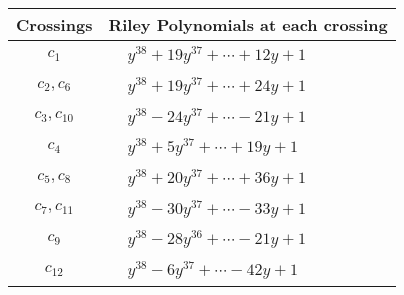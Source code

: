 \documentclass[1p]{elsarticle_modified}
\theoremstyle{definition}
\begin{document}
\begin{tabular}{m{50pt}|m{274pt}}
Crossings & \hspace{64pt}Riley Polynomials at each crossing \\
\hline $$\begin{aligned}c_{1}\end{aligned}$$&$\begin{aligned}
&y^{38}+19 y^{37}+\cdots+12 y+1
\end{aligned}$\\
\hline $$\begin{aligned}c_{2},c_{6}\end{aligned}$$&$\begin{aligned}
&y^{38}+19 y^{37}+\cdots+24 y+1
\end{aligned}$\\
\hline $$\begin{aligned}c_{3},c_{10}\end{aligned}$$&$\begin{aligned}
&y^{38}-24 y^{37}+\cdots-21 y+1
\end{aligned}$\\
\hline $$\begin{aligned}c_{4}\end{aligned}$$&$\begin{aligned}
&y^{38}+5 y^{37}+\cdots+19 y+1
\end{aligned}$\\
\hline $$\begin{aligned}c_{5},c_{8}\end{aligned}$$&$\begin{aligned}
&y^{38}+20 y^{37}+\cdots+36 y+1
\end{aligned}$\\
\hline $$\begin{aligned}c_{7},c_{11}\end{aligned}$$&$\begin{aligned}
&y^{38}-30 y^{37}+\cdots-33 y+1
\end{aligned}$\\
\hline $$\begin{aligned}c_{9}\end{aligned}$$&$\begin{aligned}
&y^{38}-28 y^{36}+\cdots-21 y+1
\end{aligned}$\\
\hline $$\begin{aligned}c_{12}\end{aligned}$$&$\begin{aligned}
&y^{38}-6 y^{37}+\cdots-42 y+1
\end{aligned}$\\
\hline
\end{tabular}\\~\\
\end{document}
